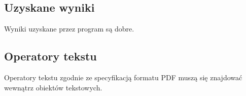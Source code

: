 \documentclass{article}
\begin{document}
\subsection{Uzyskane wyniki}
Wyniki uzyskane przez program są dobre.

\subsection{Operatory tekstu}
Operatory tekstu zgodnie ze specyfikacją formatu PDF muszą się
znajdować wewnątrz obiektów tekstowych.
\end{document}
